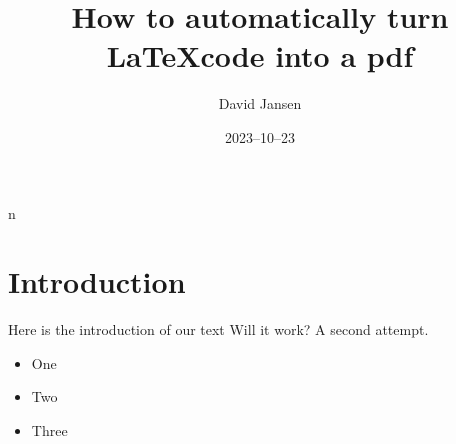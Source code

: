 n\documentclass[12pt]{article}
\title{How to automatically turn \LaTeX code into a pdf}
\author{David Jansen}
\date{2023–10–23}
\begin{document}
\maketitle

\section{Introduction}

Here is the introduction of our text
Will it work? A second attempt.

\begin{itemize}

\item One

\item Two

\item Three

\end{itemize}
\end{document}
